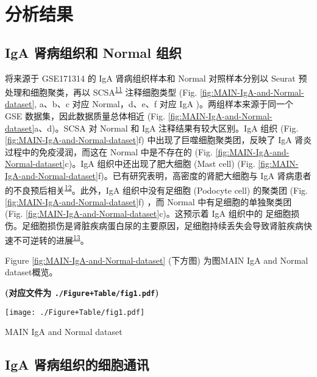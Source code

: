 \documentclass[
]{article}
\begin{document}
\hypertarget{results}{%
\section{分析结果}\label{results}}

\hypertarget{iga-ux80beux75c5ux7ec4ux7ec7ux548c-normal-ux7ec4ux7ec7}{%
\subsection{IgA 肾病组织和 Normal 组织}\label{iga-ux80beux75c5ux7ec4ux7ec7ux548c-normal-ux7ec4ux7ec7}}

将来源于 GSE171314 的 IgA 肾病组织样本和 Normal 对照样本分别以 Seurat 预处理和细胞聚类，再以 SCSA\textsuperscript{\protect\hyperlink{ref-ScsaACellTyCaoY2020}{11}} 注释细胞类型 (Fig. \ref{fig:MAIN-IgA-and-Normal-dataset}, a、b、c 对应 Normal，d、e、f 对应 IgA )。两组样本来源于同一个 GSE 数据集，因此数据质量总体相近 (Fig. \ref{fig:MAIN-IgA-and-Normal-dataset}a、d)。SCSA 对 Normal 和 IgA 注释结果有较大区别。IgA 组织 (Fig. \ref{fig:MAIN-IgA-and-Normal-dataset}f) 中出现了巨噬细胞聚类团，反映了 IgA 肾炎过程中的免疫浸润，而这在 Normal 中是不存在的 (Fig. \ref{fig:MAIN-IgA-and-Normal-dataset}c)。IgA 组织中还出现了肥大细胞 (Mast cell) (Fig. \ref{fig:MAIN-IgA-and-Normal-dataset}f)。已有研究表明，高密度的肾肥大细胞与 IgA 肾病患者的不良预后相关\textsuperscript{\protect\hyperlink{ref-HighRenalMastWang2023}{12}}。此外，IgA 组织中没有足细胞 (Podocyte cell) 的聚类团 (Fig. \ref{fig:MAIN-IgA-and-Normal-dataset}f) ，而 Normal 中有足细胞的单独聚类团 (Fig. \ref{fig:MAIN-IgA-and-Normal-dataset}c)。这预示着 IgA 组织中的 足细胞损伤。足细胞损伤是肾脏疾病蛋白尿的主要原因，足细胞持续丢失会导致肾脏疾病快速不可逆转的进展\textsuperscript{\protect\hyperlink{ref-SirtuinsAsNovLiuT2022}{13}}。

Figure \ref{fig:MAIN-IgA-and-Normal-dataset} (下方图) 为图MAIN IgA and Normal dataset概览。

\textbf{(对应文件为 \texttt{./Figure+Table/fig1.pdf})}

\def\@captype{figure}
\begin{center}
\texttt{[image: ./Figure+Table/fig1.pdf]}
\caption{MAIN IgA and Normal dataset}\label{fig:MAIN-IgA-and-Normal-dataset}
\end{center}

\hypertarget{iga-ux80beux75c5ux7ec4ux7ec7ux7684ux7ec6ux80deux901aux8baf}{%
\subsection{IgA 肾病组织的细胞通讯}\label{iga-ux80beux75c5ux7ec4ux7ec7ux7684ux7ec6ux80deux901aux8baf}}
\end{document}
